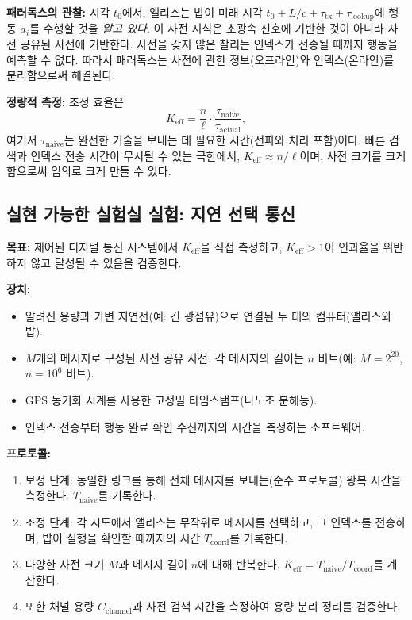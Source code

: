 \documentclass[12pt,a4paper]{article}
\begin{document}
	\textbf{패러독스의 관찰:}
	시각 \(t_0\)에서, 앨리스는 밥이 미래 시각 \(t_0 + L/c + \tau_{\text{tx}} + \tau_{\text{lookup}}\)에 행동 \(a_i\)를 수행할 것을 \emph{알고 있다}. 이 사전 지식은 초광속 신호에 기반한 것이 아니라 사전 공유된 사전에 기반한다. 사전을 갖지 않은 찰리는 인덱스가 전송될 때까지 행동을 예측할 수 없다. 따라서 패러독스는 사전에 관한 정보(오프라인)와 인덱스(온라인)를 분리함으로써 해결된다.
	
	\textbf{정량적 측정:}
	조정 효율은
	\[
	K_{\mathrm{eff}} = \frac{n}{\ell} \cdot \frac{\tau_{\text{naive}}}{\tau_{\text{actual}}},
	\]
	여기서 \(\tau_{\text{naive}}\)는 완전한 기술을 보내는 데 필요한 시간(전파와 처리 포함)이다. 빠른 검색과 인덱스 전송 시간이 무시될 수 있는 극한에서, \(K_{\mathrm{eff}} \approx n/\ell\)이며, 사전 크기를 크게 함으로써 임의로 크게 만들 수 있다.
	
	\subsection{실현 가능한 실험실 실험: 지연 선택 통신}
	\label{subsec:lab-delayed-choice}
	
	\textbf{목표:} 제어된 디지털 통신 시스템에서 \(K_{\mathrm{eff}}\)을 직접 측정하고, \(K_{\mathrm{eff}} > 1\)이 인과율을 위반하지 않고 달성될 수 있음을 검증한다.
	
	\textbf{장치:}
	\begin{itemize}
		\item 알려진 용량과 가변 지연선(예: 긴 광섬유)으로 연결된 두 대의 컴퓨터(앨리스와 밥).
		\item \(M\)개의 메시지로 구성된 사전 공유 사전. 각 메시지의 길이는 \(n\) 비트(예: \(M = 2^{20}\), \(n = 10^6\) 비트).
		\item GPS 동기화 시계를 사용한 고정밀 타임스탬프(나노초 분해능).
		\item 인덱스 전송부터 행동 완료 확인 수신까지의 시간을 측정하는 소프트웨어.
	\end{itemize}
	
	\textbf{프로토콜:}
	\begin{enumerate}
		\item 보정 단계: 동일한 링크를 통해 전체 메시지를 보내는(순수 프로토콜) 왕복 시간을 측정한다. \(T_{\text{naive}}\)를 기록한다.
		\item 조정 단계: 각 시도에서 앨리스는 무작위로 메시지를 선택하고, 그 인덱스를 전송하며, 밥이 실행을 확인할 때까지의 시간 \(T_{\text{coord}}\)를 기록한다.
		\item 다양한 사전 크기 \(M\)과 메시지 길이 \(n\)에 대해 반복한다. \(K_{\mathrm{eff}} = T_{\text{naive}} / T_{\text{coord}}\)를 계산한다.
		\item 또한 채널 용량 \(C_{\text{channel}}\)과 사전 검색 시간을 측정하여 용량 분리 정리를 검증한다.
	\end{enumerate}
	
\end{document}
